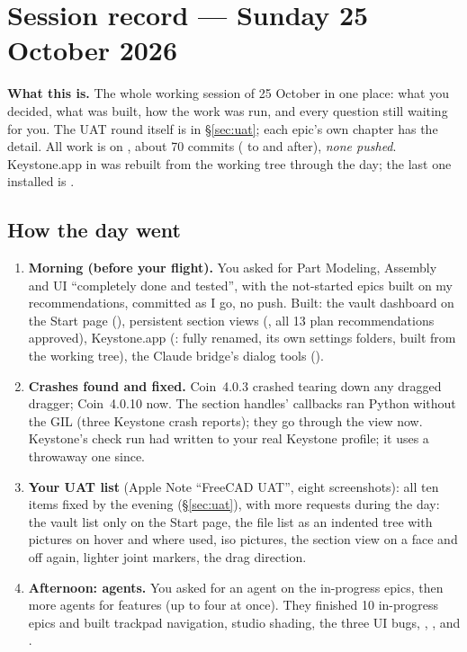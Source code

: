 \section{Session record --- Sunday 25 October 2026}\label{sec:session-25oct}

\textbf{What this is.} The whole working session of 25 October in one place: what you decided, what was built,
how the work was run, and every question still waiting for you. The UAT round itself is in \S\ref{sec:uat}; each
epic's own chapter has the detail. All work is on , about 70 \code{[BW]} commits
( to  and after), \emph{none pushed}. Keystone.app in  was
rebuilt from the working tree through the day; the last one installed is .

\subsection{How the day went}
\begin{enumerate}
  \item \textbf{Morning (before your flight).} You asked for Part Modeling, Assembly and UI ``completely done and
        tested'', with the not-started epics built on my recommendations, committed as I go, no push. Built: the
        vault dashboard on the Start page (), persistent section views (, all 13 plan
        recommendations approved), Keystone.app (: fully renamed, its own settings folders, built
        from the working tree), the Claude bridge's dialog tools ().
  \item \textbf{Crashes found and fixed.} Coin~4.0.3 crashed tearing down any dragged dragger; Coin~4.0.10 now. The
        section handles' callbacks ran Python without the GIL (three Keystone crash reports); they go through the
        view now. Keystone's check run had written to your real Keystone profile; it uses a throwaway one since.
  \item \textbf{Your UAT list} (Apple Note ``FreeCAD UAT'', eight screenshots): all ten items fixed by the evening
        (\S\ref{sec:uat}), with more requests during the day: the vault list only on the Start page, the file
        list as an indented tree with pictures on hover and where used, iso pictures, the section view on a face
        and off again, lighter joint markers, the drag direction.
  \item \textbf{Afternoon: agents.} You asked for an agent on the in-progress epics, then more agents for features
        (up to four at once). They finished 10 in-progress epics and built trackpad navigation, studio shading,
        the three UI bugs, , ,  and .
\end{enumerate}

